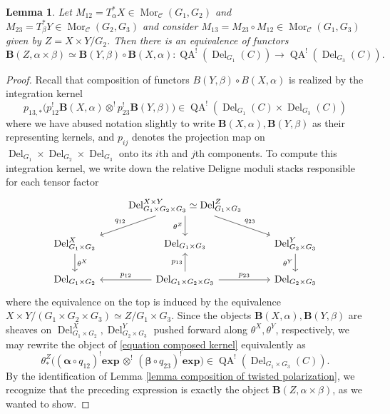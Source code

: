 \documentclass[11pt, a4paper]{amsart}
\numberwithin{equation}{section}
\newtheorem{lemma}[theorem]{Lemma}
\theoremstyle{definition}
\theoremstyle{remark}
\DeclareMathOperator{\Mor}{Mor}
\DeclareMathOperator{\Del}{Del}
\DeclareMathOperator{\QA}{QA}
\newcommand{\Cc}{\mathcal{C}}
\newcommand{\bB}{\mathbf{B}}
\renewcommand{\to}{\longrightarrow}
\begin{document}
\begin{lemma}
    Let $M_{12} = T^*_\alpha X \in \Mor_{\Cc}(G_1, G_2)$ and $M_{23} = T^*_\beta Y \in \Mor_{\Cc}(G_2, G_3)$ and consider $M_{13} = M_{23} \circ M_{12} \in \Mor_{\Cc}(G_1, G_3)$ given by $Z = X \times Y/G_2$. Then there is an equivalence of functors
    $$\bB(Z, \alpha \times \beta) \simeq \bB(Y, \beta) \circ \bB(X, \alpha): \QA^!(\Del_{G_1}(C)) \to \QA^!(\Del_{G_3}(C)).$$
\end{lemma}
\begin{proof}
     Recall that composition of functors $B(Y, \beta) \circ B(X,\alpha)$ is realized by the integration kernel 
    \begin{equation} \label{equation composed kernel}
        p_{13,*}\big(p_{12}^! \bB(X,\alpha) \otimes^! p_{23}^! \bB(Y, \beta)\big) \in \QA^!(\Del_{G_1}(C) \times \Del_{G_3}(C))
    \end{equation}
    where we have abused notation slightly to write $\bB(X,\alpha), \bB(Y, \beta)$ as their representing kernels, and $p_{ij}$ denotes the projection map on $\Del_{G_1} \times \Del_{G_2} \times \Del_{G_3}$ onto its $i$th and $j$th components. To compute this integration kernel, we write down the relative Deligne moduli stacks responsible for each tensor factor
    $$\begin{tikzcd}
	& {\Del_{G_1 \times G_2 \times G_3}^{X \times Y} \simeq \Del_{G_1 \times G_3}^Z} & \\
	{\Del_{G_1 \times G_2}^X} & {\Del_{G_1 \times G_3}} & {\Del_{G_2 \times G_3}^Y} \\
	{\Del_{G_1 \times G_2}} & {\Del_{G_1 \times G_2 \times G_3}} & {\Del_{G_2 \times G_3}}
	\arrow["{q_{12}}"', from=1-2, to=2-1]
	\arrow["{\theta^Z}"', from=1-2, to=2-2]
	\arrow["{q_{23}}", from=1-2, to=2-3]
	\arrow["{\theta^X}", from=2-1, to=3-1]
	\arrow["{\theta^Y}"', from=2-3, to=3-3]
	\arrow["{p_{13}}", from=3-2, to=2-2]
	\arrow["{p_{12}}"', from=3-2, to=3-1]
	\arrow["{p_{23}}", from=3-2, to=3-3]
\end{tikzcd}$$
where the equivalence on the top is induced by the equivalence $X \times Y/(G_1 \times G_2 \times G_3) \simeq Z/G_1 \times G_3$. Since the objects $\bB(X,\alpha), \bB(Y,\beta)$ are sheaves on $\Del_{G_1 \times G_2}^X, \Del_{G_2 \times G_3}^Y$ pushed forward along $\theta^X, \theta^Y$, respectively, we may rewrite the object of \eqref{equation composed kernel} equivalently as
\begin{equation}
    \theta^Z_*\big(( \boldsymbol{\alpha} \circ q_{12})^!\mathbf{exp} \,  \otimes^! \,  (\boldsymbol{\beta} \circ q_{23})^!\mathbf{exp}\big) \in \QA^!(\Del_{G_1 \times G_3}(C)).
\end{equation}
By the identification of Lemma \ref{lemma composition of twisted polarization}, we recognize that the preceding expression is exactly the object $\bB(Z,\alpha \times \beta)$, as we wanted to show.
\end{proof}
\end{document}
